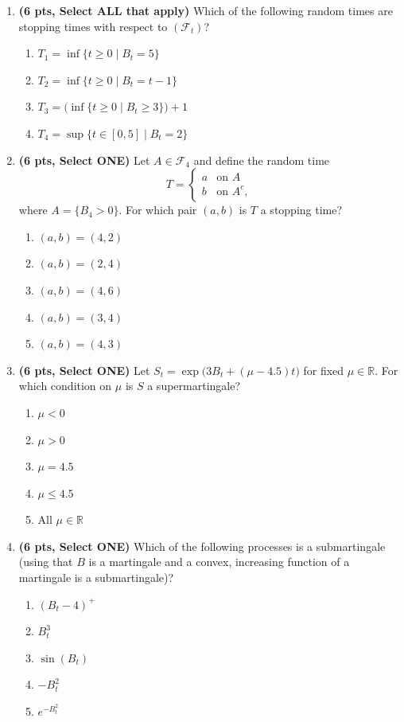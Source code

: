 \documentclass[11pt]{article}
\newcommand{\R}{\mathbb{R}}
\begin{document}
\begin{enumerate}

\item[\textbf{Q1.}] \textbf{(6 pts, Select ALL that apply)} Which of the following random times are stopping times with respect to $(\mathcal F_t)$?
\begin{enumerate}
  \item $T_1=\inf\{t\ge 0 \mid B_t=5\}$
  \item $T_2=\inf\{t\ge 0 \mid B_t=t-1\}$
  \item $T_3=\big(\inf\{t\ge 0 \mid B_t\ge 3\}\big)+1$
  \item $T_4=\sup\{t\in[0,5]\mid B_t=2\}$
\end{enumerate}

\item[\textbf{Q2.}] \textbf{(6 pts, Select ONE)} Let $A\in\mathcal F_4$ and define the random time
\[
T=\begin{cases}a & \text{on } A\\ b & \text{on } A^c,\end{cases}
\]
where $A=\{B_4>0\}$. For which pair $(a,b)$ is $T$ a stopping time?
\begin{enumerate}
  \item $(a,b)=(4,2)$
  \item $(a,b)=(2,4)$
  \item $(a,b)=(4,6)$
  \item $(a,b)=(3,4)$
  \item $(a,b)=(4,3)$
\end{enumerate}

\item[\textbf{Q3.}] \textbf{(6 pts, Select ONE)} Let $S_t=\exp\big(3B_t+(\mu-4.5)t\big)$ for fixed $\mu\in\R$. For which condition on $\mu$ is $S$ a supermartingale?
\begin{enumerate}
  \item $\mu<0$
  \item $\mu>0$
  \item $\mu=4.5$
  \item $\mu\le4.5$
  \item All $\mu\in\R$
\end{enumerate}

\item[\textbf{Q4.}] \textbf{(6 pts, Select ONE)} Which of the following processes is a submartingale (using that $B$ is a martingale and a convex, increasing function of a martingale is a submartingale)?
\begin{enumerate}
  \item $(B_t-4)^+$
  \item $B_t^3$
  \item $\sin(B_t)$
  \item $-B_t^2$
  \item $e^{-B_t^2}$
\end{enumerate}


\end{enumerate}
\end{document}
